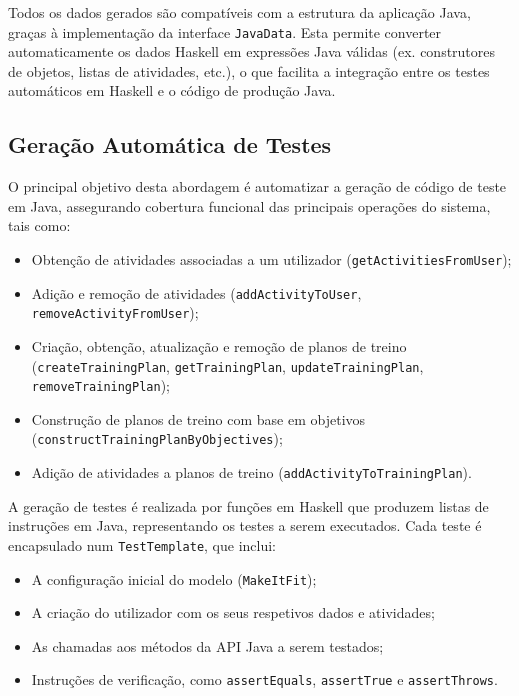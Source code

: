 \documentclass[12pt, a4paper]{article}
\begin{document}
Todos os dados gerados são compatíveis com a estrutura da aplicação Java, graças à implementação da
interface \texttt{JavaData}. Esta permite converter automaticamente os dados Haskell em expressões
Java válidas (ex. construtores de objetos, listas de atividades, etc.), o que facilita a integração
entre os testes automáticos em Haskell e o código de produção Java.

\subsection{Geração Automática de Testes}

O principal objetivo desta abordagem é automatizar a geração de código de teste em Java, assegurando
cobertura funcional das principais operações do sistema, tais como:

\begin{itemize}
  \item Obtenção de atividades associadas a um utilizador (\texttt{getActivitiesFromUser});
  \item Adição e remoção de atividades (\texttt{addActivityToUser},
  \texttt{removeActivityFromUser});
  \item Criação, obtenção, atualização e remoção de planos de treino (\texttt{createTrainingPlan},
  \texttt{getTrainingPlan}, \texttt{updateTrainingPlan}, \texttt{removeTrainingPlan});
  \item Construção de planos de treino com base em objetivos
  (\texttt{constructTrainingPlanByObjectives});
  \item Adição de atividades a planos de treino (\texttt{addActivityToTrainingPlan}).
\end{itemize}

A geração de testes é realizada por funções em Haskell que produzem listas de instruções em Java,
representando os testes a serem executados. Cada teste é encapsulado num \texttt{TestTemplate}, que
inclui:

\begin{itemize}
  \item A configuração inicial do modelo (\texttt{MakeItFit});
  \item A criação do utilizador com os seus respetivos dados e atividades;
  \item As chamadas aos métodos da API Java a serem testados;
  \item Instruções de verificação, como \texttt{assertEquals}, \texttt{assertTrue} e
  \texttt{assertThrows}.
\end{itemize}
\end{document}
